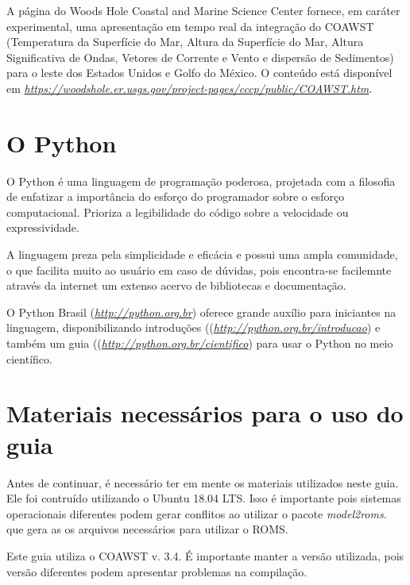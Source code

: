 \noindent A página do Woods Hole Coastal and Marine Science Center fornece, em caráter experimental, uma apresentação em tempo real da integração do COAWST (Temperatura da Superfície do Mar, Altura da Superfície do Mar, Altura Significativa de Ondas, Vetores de Corrente e Vento e dispersão de Sedimentos) para o leste dos Estados Unidos e Golfo do México. O conteúdo está disponível em \textcolor{bleu_cite}{\href{https://woodshole.er.usgs.gov/project-pages/cccp/public/COAWST.htm}{\textit{https://woodshole.er.usgs.gov/project-pages/cccp/public/COAWST.htm}}}.
\bigskip

\section{O Python}
\bigskip

\noindent O Python é uma linguagem de programação poderosa, projetada com a filosofia de enfatizar a importância do esforço do programador sobre o esforço computacional. Prioriza a legibilidade do código sobre a velocidade ou expressividade.
\bigskip

\noindent A linguagem preza pela simplicidade e eficácia e possui uma ampla comunidade, o que facilita muito ao usuário em caso de dúvidas, pois encontra-se facilemnte através da internet um extenso acervo de bibliotecas e documentação.
\bigskip

\noindent O Python Brasil (\textcolor{bleu_cite}{\href{http://python.org.br}{\textit{http://python.org.br}}}) oferece grande auxílio para iniciantes na linguagem, disponibilizando introduções ((\textcolor{bleu_cite}{\href{http://python.org.br/introducao}{\textit{http://python.org.br/introducao}}}) e também um guia ((\textcolor{bleu_cite}{\href{http://python.org.br/cientifico}{\textit{http://python.org.br/cientifico}}}) para usar o Python no meio científico.



\section{Materiais necessários para o uso do guia}
\bigskip

\noindent Antes de continuar, é necessário ter em mente os materiais utilizados neste guia. Ele foi contruído  utilizando o Ubuntu 18.04 LTS. Isso é importante pois sistemas operacionais diferentes podem gerar conflitos ao utilizar o pacote \textit{model2roms}. que gera as os arquivos necessários para utilizar o ROMS.
\bigskip

\noindent Este guia utiliza o COAWST v. 3.4. É importante manter a versão utilizada, pois versão diferentes podem apresentar problemas na compilação.
